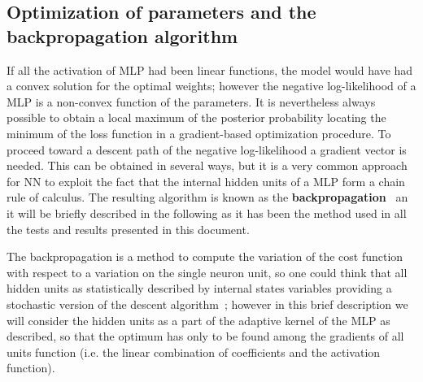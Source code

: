 





\subsection{Optimization of parameters and the backpropagation algorithm}


If all the activation of \acs{MLP} had been linear functions, the model would have had a convex solution for the optimal weights; however the negative log-likelihood of a \acl{MLP} is a non-convex function of the parameters. It is nevertheless always possible to obtain a local maximum of the posterior probability locating the minimum of the loss function in a gradient-based optimization procedure. 
To proceed toward a descent path of the negative log-likelihood a gradient vector is needed. This can be obtained in several ways, but it is a very common approach for NN to exploit the fact that the internal hidden units of a \acl{MLP} form a chain rule of calculus. The resulting algorithm is known as the \textbf{backpropagation}~\cite{NIPS2012_4824} an it will be briefly described in the following as it has been the method used in all the tests and results presented in this document. 

The backpropagation is a method to compute the variation of the cost function with respect to a variation on the single neuron unit, so one could think that all hidden units as statistically described by internal states variables providing a stochastic version of the descent algorithm~\cite{rezende2014stochastic}; however in this brief description we will consider the hidden units as a part of the adaptive kernel of the \acl{MLP} as described, so that the optimum has only to be found among the gradients of all units function (i.e. the linear combination of coefficients and the activation function). 

